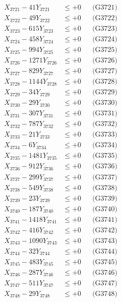 \documentclass[a4paper,10pt]{article}
\begin{document}
{\begin{align}
\allowbreak
X_{3721} - 41Y_{3721} &\leq +0 && \text{(G3721)} \\
X_{3722} - 49Y_{3722} &\leq +0 && \text{(G3722)} \\
X_{3723} - 615Y_{3723} &\leq +0 && \text{(G3723)} \\
X_{3724} - 458Y_{3724} &\leq +0 && \text{(G3724)} \\
X_{3725} - 994Y_{3725} &\leq +0 && \text{(G3725)} \\
X_{3726} - 1271Y_{3726} &\leq +0 && \text{(G3726)} \\
X_{3727} - 829Y_{3727} &\leq +0 && \text{(G3727)} \\
X_{3728} - 1144Y_{3728} &\leq +0 && \text{(G3728)} \\
X_{3729} - 34Y_{3729} &\leq +0 && \text{(G3729)} \\
X_{3730} - 29Y_{3730} &\leq +0 && \text{(G3730)} \\
\allowbreak
X_{3731} - 307Y_{3731} &\leq +0 && \text{(G3731)} \\
X_{3732} - 787Y_{3732} &\leq +0 && \text{(G3732)} \\
X_{3733} - 21Y_{3733} &\leq +0 && \text{(G3733)} \\
X_{3734} - 6Y_{3734} &\leq +0 && \text{(G3734)} \\
X_{3735} - 1481Y_{3735} &\leq +0 && \text{(G3735)} \\
X_{3736} - 912Y_{3736} &\leq +0 && \text{(G3736)} \\
X_{3737} - 299Y_{3737} &\leq +0 && \text{(G3737)} \\
X_{3738} - 549Y_{3738} &\leq +0 && \text{(G3738)} \\
X_{3739} - 23Y_{3739} &\leq +0 && \text{(G3739)} \\
X_{3740} - 187Y_{3740} &\leq +0 && \text{(G3740)} \\
\allowbreak
X_{3741} - 1418Y_{3741} &\leq +0 && \text{(G3741)} \\
X_{3742} - 416Y_{3742} &\leq +0 && \text{(G3742)} \\
X_{3743} - 1090Y_{3743} &\leq +0 && \text{(G3743)} \\
X_{3744} - 32Y_{3744} &\leq +0 && \text{(G3744)} \\
X_{3745} - 483Y_{3745} &\leq +0 && \text{(G3745)} \\
X_{3746} - 287Y_{3746} &\leq +0 && \text{(G3746)} \\
X_{3747} - 511Y_{3747} &\leq +0 && \text{(G3747)} \\
X_{3748} - 29Y_{3748} &\leq +0 && \text{(G3748)} \\

\end{align}}
\end{document}
